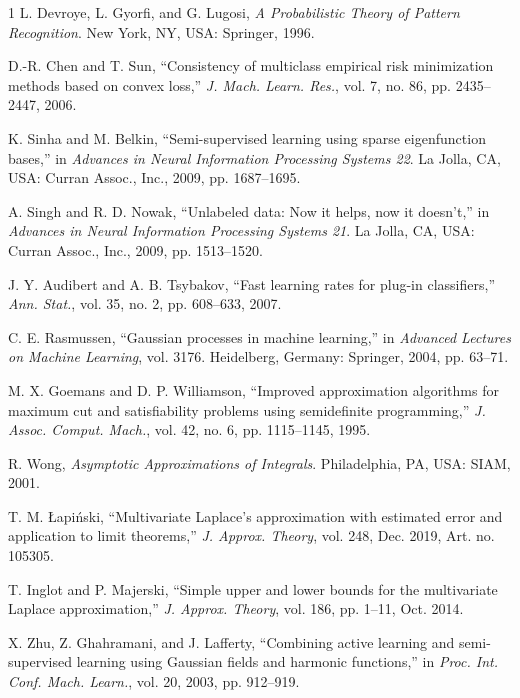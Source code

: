 \documentclass[10pt,twocolumn]{IEEEtran}
\begin{document}
\begin{thebibliography}{1}
		L. Devroye, L. Gyorfi, and G. Lugosi, \emph{A Probabilistic Theory of Pattern Recognition}. New York, NY, USA: Springer, 1996.
		
		D.-R. Chen and T. Sun, ``Consistency of multiclass empirical risk minimization methods based on convex loss,'' \emph{J. Mach. Learn. Res.}, vol. 7, no. 86, pp. 2435--2447, 2006.
		
		K. Sinha and M. Belkin, ``Semi-supervised learning using sparse eigenfunction bases,'' in \emph{Advances in Neural Information Processing Systems 22}. La Jolla, CA, USA: Curran Assoc., Inc., 2009, pp. 1687--1695.
		
		A. Singh and R. D. Nowak, ``Unlabeled data: Now it helps, now it doesn't,'' in \emph{Advances in Neural Information Processing Systems 21}. La Jolla, CA, USA: Curran Assoc., Inc., 2009, pp. 1513--1520.
		
		J. Y. Audibert and A. B. Tsybakov, ``Fast learning rates for plug-in classifiers,'' \emph{Ann. Stat.}, vol. 35, no. 2, pp. 608--633, 2007.
		
		C. E. Rasmussen, ``Gaussian processes in machine learning,'' in \emph{Advanced Lectures on Machine Learning}, vol. 3176. Heidelberg, Germany: Springer, 2004, pp. 63--71.
		
		M. X. Goemans and D. P. Williamson, ``Improved approximation algorithms for maximum cut and satisfiability problems using semidefinite programming,'' \emph{J. Assoc. Comput. Mach.}, vol. 42, no. 6, pp. 1115--1145, 1995.
		
		R. Wong, \emph{Asymptotic Approximations of Integrals}. Philadelphia, PA, USA: SIAM, 2001.
		
		T. M. Łapiński, ``Multivariate Laplace's approximation with estimated error and application to limit theorems,'' \emph{J. Approx. Theory}, vol. 248, Dec. 2019, Art. no. 105305.
		
		T. Inglot and P. Majerski, ``Simple upper and lower bounds for the multivariate Laplace approximation,'' \emph{J. Approx. Theory}, vol. 186, pp. 1--11, Oct. 2014.
		
		X. Zhu, Z. Ghahramani, and J. Lafferty, ``Combining active learning and semi-supervised learning using Gaussian fields and harmonic functions,'' in \emph{Proc. Int. Conf. Mach. Learn.}, vol. 20, 2003, pp. 912--919.
		

\end{thebibliography}
\end{document}
